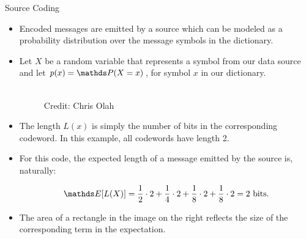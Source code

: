 \documentclass[11pt,compress,t,notes=noshow, xcolor=table]{beamer}
\begin{document}
\begin{vbframe} {Source Coding}
\begin{itemize}
  \item Encoded messages are emitted by a source which can be modeled as a probability distribution over the message symbols in the dictionary. 
  \item Let $X$ be a random variable that represents a symbol from our data source and let $p(x) = \P(X = x)$, for symbol $x$ in our dictionary.
  \begin{figure}
    \centering
      \tiny{\\ Credit: Chris Olah}
  \end{figure}
  \item The length $L(x)$ is simply the number of bits in the corresponding codeword. In this example, all codewords have length 2.
\end{itemize}
\framebreak

  \begin{figure}
    \centering
  \end{figure}
  
  \begin{itemize}
    \item For this code, the expected length of a message emitted by the source is, naturally:

      $$\E[L(X)] = \frac{1}{2} \cdot 2 + \frac{1}{4} \cdot 2 + \frac{1}{8} \cdot 2 + \frac{1}{8} \cdot 2 = 2 \text{ bits.}$$

    \item The area of a rectangle in the image on the right reflects the size of the corresponding term in the expectation.


\end{itemize}
\end{vbframe}
\end{document}
